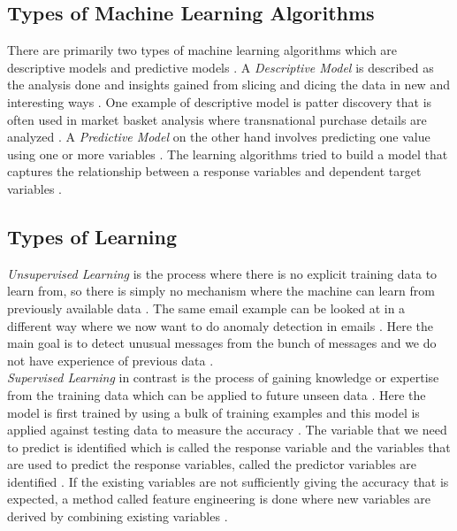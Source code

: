 \documentclass[sigconf]{acmart}
\begin{document}
\subsection{Types of Machine Learning Algorithms}
There are primarily two types of machine learning algorithms which are descriptive models and predictive models \cite{book-shai}. A {\em Descriptive Model} is described as the analysis done and insights gained from slicing and dicing the data in new and interesting ways \cite{book-shai}. One example of descriptive model is patter discovery that is often used in market basket analysis where transnational purchase details are analyzed \cite{book-shai}. A {\em Predictive Model} on the other hand involves predicting one value using one or more variables \cite{book-shai}. The learning algorithms tried to build a model that captures the relationship between a response variables and dependent target variables \cite{book-tan}.

\subsection{Types of Learning}
{\em Unsupervised Learning} is the process where there is no explicit training data to learn from, so there is simply no mechanism where the machine can learn from previously available data \cite{book-shai}. The same email example can be looked at in a different way where we now want to do anomaly detection in emails \cite{book-shai}. Here the main goal is to detect unusual messages from the bunch of messages and we do not have experience of previous data \cite{book-shai}. \\

{\em Supervised Learning} in contrast is the process of gaining knowledge or expertise from the training data which can be applied to future unseen data \cite{book-shai}. Here the model is first trained by using a bulk of training examples and this model is applied against testing data to measure the accuracy \cite{book-shai}. The variable that we need to predict is identified which is called the response variable and the variables that are used to predict the response variables, called the predictor variables are identified \cite{book-shai}. If the existing variables are not sufficiently giving the accuracy that is expected, a method called feature engineering is done where new variables are derived by combining existing variables \cite{book-shai}. 
\end{document}
